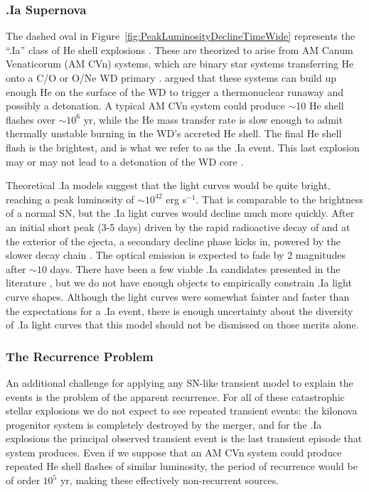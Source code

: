\subsubsection{.Ia Supernova}

The dashed oval in Figure~\ref{fig:PeakLuminosityDeclineTimeWide}
represents the ``.Ia'' class of He shell explosions
\citep{Bildsten:2007}. These are theorized to arise from AM Canum
Venaticorum (AM CVn) systems, which are binary star systems
transferring He onto a C/O or O/Ne WD primary
\citep{Warner:1995, Nelemans:2005}.  \citet{Bildsten:2007} argued that
these systems can build up enough He on the surface of the WD to
trigger a thermonuclear runaway and possibly a detonation. A typical
AM CVn system could produce $\sim$10 He shell flashes over $\sim10^6$
yr, while the He mass transfer rate is slow enough to admit thermally
unstable burning in the WD's accreted He shell.  The final He shell
flash is the brightest, and is what we refer to as the .Ia event. This
last explosion may or may not lead to a detonation of the WD core
\citep[the double detonation scenario;][]{Nomoto:1982a, Nomoto:1982b,
  Woosley:1986, Woosley:1994}.

Theoretical .Ia models suggest that the light curves would be quite
bright, reaching a peak luminosity of $\sim10^{42}$ erg s$^{-1}$.
That is comparable to the brightness of a normal SN, but the .Ia light
curves would decline much more quickly.  After an initial short peak
(3-5 days) driven by the rapid radioactive decay of 
and  at the exterior of the ejecta, a secondary
decline phase kicks in, powered by the slower  decay
chain \citep{Shen:2010}. The optical emission is expected to fade by 2
magnitudes after $\sim10$ days.  There have been a few viable .Ia
candidates presented in the literature \citep{Kasliwal:2010,
  Perets:2010, Poznanski:2010}, but we do not have enough objects to
empirically constrain .Ia light curve shapes.  Although the \spock
light curves were somewhat fainter and faster than the expectations
for a .Ia event, there is enough uncertainty about the diversity of
.Ia light curves that this model should not be dismissed on those
merits alone.

\subsubsection{The Recurrence Problem}

An additional challenge for applying any SN-like transient model to
explain the \spock events is the problem of the apparent
recurrence.  For all of these catastrophic stellar explosions we do
not expect to see repeated transient events: the kilonova progenitor
system is completely destroyed by the merger, and for the .Ia
explosions the principal observed transient event is the last
transient episode that system produces.  Even if we suppose that an AM
CVn system could produce repeated He shell flashes of similar
luminosity, the period of recurrence would be of order $10^5$ yr,
making these effectively non-recurrent sources.

